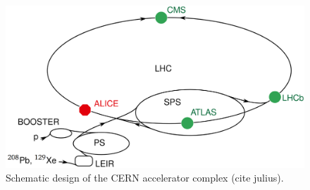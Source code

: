 \documentclass[12pt,a4paper]{report}
\begin{document}
\begin{figure}[tb!]
\centering
\includegraphics[width=12cm]{Plots/LHC.png}  
\caption{Schematic design of the CERN accelerator complex (cite julius).}
\label{LHC}
\end{figure}
\end{document}
